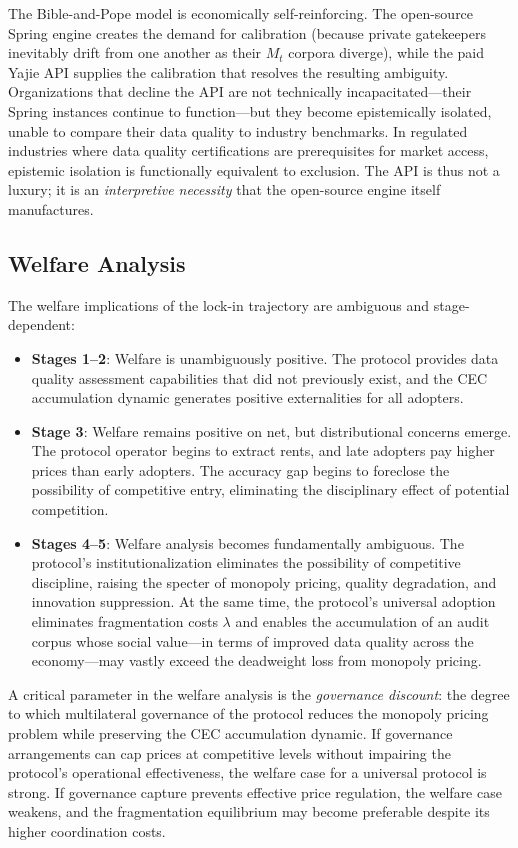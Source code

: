 \documentclass[12pt,a4paper]{ctexart}
\theoremstyle{definition}
\theoremstyle{remark}
\begin{document}
The Bible-and-Pope model is economically self-reinforcing. The open-source Spring engine creates the demand for calibration (because private gatekeepers inevitably drift from one another as their $M_t$ corpora diverge), while the paid Yajie API supplies the calibration that resolves the resulting ambiguity. Organizations that decline the API are not technically incapacitated—their Spring instances continue to function—but they become epistemically isolated, unable to compare their data quality to industry benchmarks. In regulated industries where data quality certifications are prerequisites for market access, epistemic isolation is functionally equivalent to exclusion. The API is thus not a luxury; it is an \textit{interpretive necessity} that the open-source engine itself manufactures.

\subsection{Welfare Analysis}

The welfare implications of the lock-in trajectory are ambiguous and stage-dependent:
\begin{itemize}
\item \textbf{Stages 1–2}: Welfare is unambiguously positive. The protocol provides data quality assessment capabilities that did not previously exist, and the CEC accumulation dynamic generates positive externalities for all adopters.
\item \textbf{Stage 3}: Welfare remains positive on net, but distributional concerns emerge. The protocol operator begins to extract rents, and late adopters pay higher prices than early adopters. The accuracy gap begins to foreclose the possibility of competitive entry, eliminating the disciplinary effect of potential competition.
\item \textbf{Stages 4–5}: Welfare analysis becomes fundamentally ambiguous. The protocol's institutionalization eliminates the possibility of competitive discipline, raising the specter of monopoly pricing, quality degradation, and innovation suppression. At the same time, the protocol's universal adoption eliminates fragmentation costs $\lambda$ and enables the accumulation of an audit corpus whose social value—in terms of improved data quality across the economy—may vastly exceed the deadweight loss from monopoly pricing.
\end{itemize}

A critical parameter in the welfare analysis is the \textit{governance discount}: the degree to which multilateral governance of the protocol reduces the monopoly pricing problem while preserving the CEC accumulation dynamic. If governance arrangements can cap prices at competitive levels without impairing the protocol's operational effectiveness, the welfare case for a universal protocol is strong. If governance capture prevents effective price regulation, the welfare case weakens, and the fragmentation equilibrium may become preferable despite its higher coordination costs.
\end{document}
